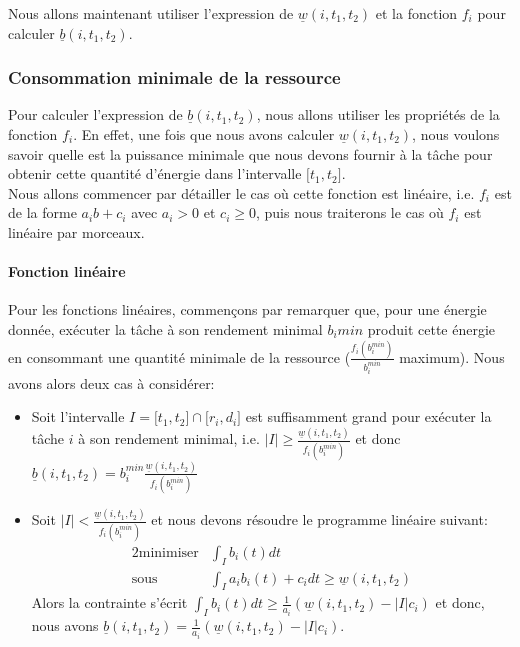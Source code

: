\documentclass{report}
\newcommand{\bb}{\underline{b}(i,t_1,t_2)}
\newcommand{\wb}{\underline{w}(i,t_1,t_2)}
\begin{document}
Nous allons maintenant utiliser l'expression de $\wb$ et la fonction $f_i$ pour calculer $\bb$.

\subsubsection{Consommation minimale de la ressource}
	
Pour calculer l'expression de $\bb$, nous allons utiliser les propriétés de la fonction $f_i$. En effet, une fois que nous avons calculer $\wb$, nous voulons savoir quelle est la puissance minimale que nous devons fournir à la tâche pour obtenir cette quantité d'énergie dans l'intervalle ${[}t_1,t_2{]}$.\\
Nous allons commencer par détailler le cas où cette fonction est linéaire, i.e. $f_i$ est de la forme $a_ib+c_i$ avec $a_i >0$ et $c_i \ge 0$, puis nous traiterons le cas où $f_i$ est linéaire par morceaux.
	
\paragraph{Fonction linéaire}
	
Pour les fonctions linéaires, commençons par remarquer que, pour une énergie donnée, exécuter la tâche à son rendement minimal $b_i{min}$ produit cette énergie en consommant une quantité minimale de la ressource ($\frac{f_i(b_i^{min})}{b_i^{min}}$ maximum). Nous avons alors deux cas à considérer:
	
\begin{itemize}
\item Soit l'intervalle $I={[}t_1,t_2{]}\cap {[}r_i,d_i{]}$ est suffisamment grand pour exécuter la tâche $i$ à son rendement minimal, i.e. $|I| \ge \frac{\wb}{f_i(b_i^{min})}$ et donc $\bb=b_i^{min}\frac{\wb}{f_i(b_i^{min})}$
	
\item Soit $|I| < \frac{\wb}{f_i(b_i^{min})}$ et nous devons résoudre le programme linéaire suivant:
  \begin{alignat*}{2}
    \text{minimiser}   & \int_{I} b_i(t)dt  \\
    \text{sous} & \int_{I} a_ib_i(t)+c_idt \ge \wb
  \end{alignat*}
  Alors la contrainte s'écrit $\int_{I} b_i(t)dt \ge \frac{1}{a_i}(\wb-|I|c_i)$ et donc, nous avons $\bb= \frac{1}{a_i}(\wb-|I|c_i)$.\\
\end{itemize}
\end{document}
